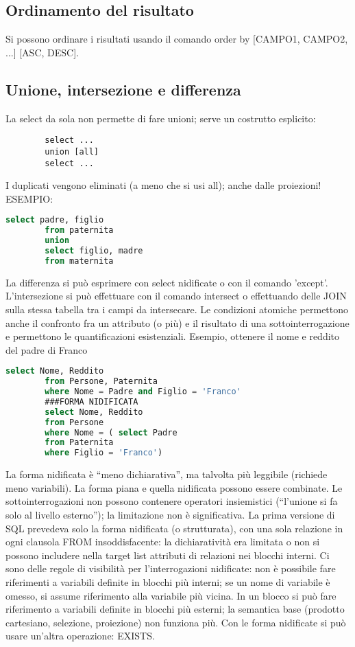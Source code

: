 \documentclass{article}
\begin{document}
\subsection{Ordinamento del risultato}
Si possono ordinare i risultati usando il comando order by [CAMPO1, CAMPO2, ...] [ASC, DESC]. 
\subsection{Unione, intersezione e differenza}
La select da sola non permette di fare unioni; serve un costrutto esplicito:
\begin{center}
\centering
    \begin{lstlisting}
        select ...
        union [all]
        select ...
    \end{lstlisting}
\end{center}
I duplicati vengono eliminati (a meno che si usi all); anche dalle proiezioni!
ESEMPIO:
\begin{center}
\centering
    \begin{lstlisting}[language=SQL]
        select padre, figlio
        from paternita
        union
        select figlio, madre
        from maternita
    \end{lstlisting}
\end{center}
La differenza si può esprimere con select nidificate o con il comando 'except'.
L'intersezione si può effettuare con il comando intersect o effettuando delle JOIN sulla stessa tabella tra i campi da intersecare.
Le condizioni atomiche permettono anche il confronto fra un attributo (o più) e il risultato di una sottointerrogazione e permettono le quantificazioni esistenziali.
Esempio, ottenere il nome e reddito del padre di Franco
\begin{center}
\centering
    \begin{lstlisting}[language=SQL]
        select Nome, Reddito
        from Persone, Paternita
        where Nome = Padre and Figlio = 'Franco'
        ###FORMA NIDIFICATA
        select Nome, Reddito
        from Persone
        where Nome = ( select Padre
        from Paternita
        where Figlio = 'Franco')
    \end{lstlisting}
\end{center}
La forma nidificata è “meno dichiarativa”, ma talvolta più leggibile (richiede meno variabili). La forma piana e quella nidificata possono essere combinate. Le sottointerrogazioni non possono contenere operatori insiemistici (“l’unione si fa solo al livello esterno”); la limitazione non è significativa.
La prima versione di SQL prevedeva solo la forma nidificata (o strutturata), con una sola relazione in ogni clausola FROM insoddisfacente: la dichiaratività era limitata o non si possono includere nella target list attributi di relazioni nei blocchi interni.
Ci sono delle regole di visibilità per l'interrogazioni nidificate: non è possibile fare riferimenti a variabili definite in blocchi più interni; se un nome di variabile è omesso, si assume riferimento alla variabile più vicina.
In un blocco si può fare riferimento a variabili definite in blocchi più esterni; la semantica base (prodotto cartesiano, selezione, proiezione) non funziona più.
Con le forma nidificate si può usare un'altra operazione: EXISTS.
\end{document}
